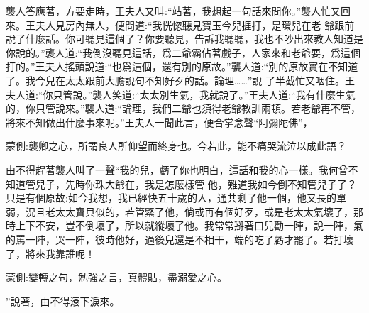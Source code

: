\begin{parag}
    襲人答應著，方要走時，王夫人又叫:“站著，我想起一句話來問你。”襲人忙又回來。王夫人見房內無人，便問道:“我恍惚聽見寶玉今兒捱打，是環兒在老 爺跟前說了什麼話。你可聽見這個了？你要聽見，告訴我聽聽，我也不吵出來教人知道是你說的。”襲人道:“我倒沒聽見這話，爲二爺霸佔著戲子，人家來和老爺要，爲這個打的。”王夫人搖頭說道:“也爲這個，還有別的原故。”襲人道:“別的原故實在不知道了。我今兒在太太跟前大膽說句不知好歹的話。論理……”說 了半截忙又咽住。王夫人道:“你只管說。”襲人笑道:“太太別生氣，我就說了。”王夫人道:“我有什麼生氣的，你只管說來。”襲人道:“論理，我們二爺也須得老爺教訓兩頓。若老爺再不管，將來不知做出什麼事來呢。”王夫人一聞此言，便合掌念聲“阿彌陀佛”，\begin{note}蒙側:襲卿之心，所謂良人所仰望而終身也。今若此，能不痛哭流泣以成此語？\end{note}由不得趕著襲人叫了一聲“我的兒，虧了你也明白，這話和我的心一樣。我何曾不知道管兒子，先時你珠大爺在，我是怎麼樣管 他，難道我如今倒不知管兒子了？只是有個原故:如今我想，我已經快五十歲的人，通共剩了他一個，他又長的單弱，況且老太太寶貝似的，若管緊了他，倘或再有個好歹，或是老太太氣壞了，那時上下不安，豈不倒壞了，所以就縱壞了他。我常常掰著口兒勸一陣，說一陣，氣的罵一陣，哭一陣，彼時他好，過後兒還是不相干，端的吃了虧才罷了。若打壞了，將來我靠誰呢！\begin{note}蒙側:變轉之句，勉強之言，真體貼，盡溺愛之心。\end{note}”說著，由不得滾下淚來。
\end{parag}


